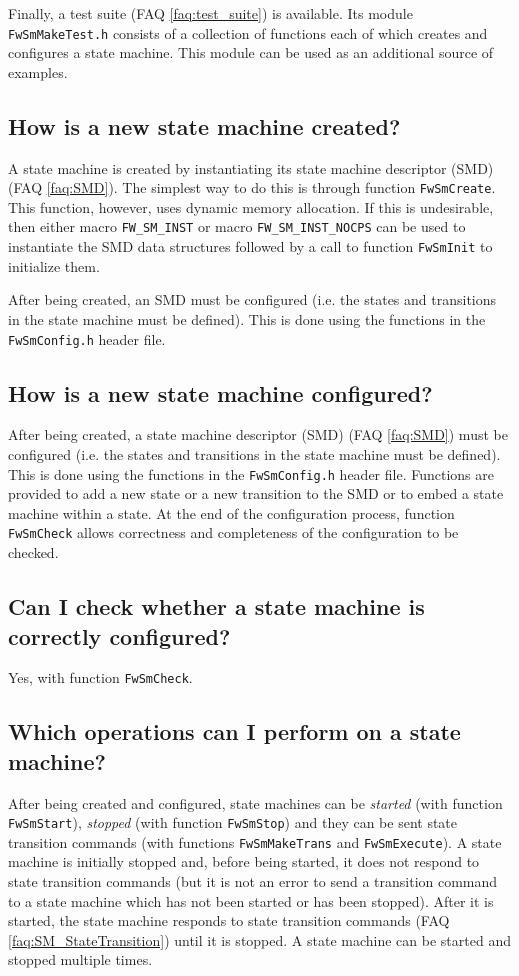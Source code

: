 \documentclass[a4paper,10pt]{article}
\begin{document}
Finally, a test suite (FAQ \ref{faq:test_suite}) is available. Its module \texttt{FwSmMakeTest.h} consists of a collection of functions each of 
which creates and configures a state machine. This module can be used as an additional source of examples.

\subsection{How is a new state machine created?}
A state machine is created by instantiating its state machine descriptor (SMD) (FAQ \ref{faq:SMD}). The simplest way to do this is through function \texttt{FwSmCreate}. 
This function, however, uses dynamic memory allocation. If this is undesirable, then either macro \texttt{FW\_SM\_INST} or
macro \texttt{FW\_SM\_INST\_NOCPS} can be used to instantiate 
the SMD data structures followed by a call to function \texttt{FwSmInit} to initialize them.

After being created, an SMD must be configured (i.e. the states and transitions in the state machine must be defined). This is done using the functions 
in the \texttt{FwSmConfig.h} header file.

\subsection{How is a new state machine configured?}
After being created, a state machine descriptor (SMD) (FAQ \ref{faq:SMD}) must be configured (i.e. the states and transitions in the state machine must be defined). 
This is done using the functions in the \texttt{FwSmConfig.h} header file. Functions are provided to add a new state or a new transition to the SMD or 
to embed a state machine within a state. At the end of the configuration process, function \texttt{FwSmCheck} allows correctness and completeness of 
the configuration to be checked.

\subsection{Can I check whether a state machine is correctly configured?}
Yes, with function \texttt{FwSmCheck}.

\subsection{Which operations can I perform on a state machine?}
After being created and configured, state machines can be \emph{started} (with function \texttt{FwSmStart}), \emph{stopped} (with function 
\texttt{FwSmStop}) and they can be sent state transition commands (with functions \texttt{FwSmMakeTrans} and \texttt{FwSmExecute}). 
A state machine is initially stopped and, before being started, 
it does not respond to state transition commands (but it is not an error to send a transition command to a state machine 
which has not been started or has been stopped). 
After it is started, the state machine responds to state transition commands (FAQ \ref{faq:SM_StateTransition}) 
until it is stopped. A state machine can be started and stopped multiple times.
\end{document}
